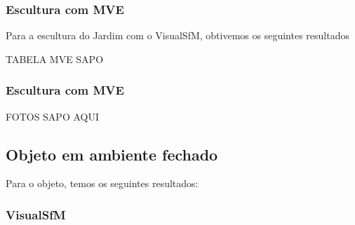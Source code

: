 \documentclass[table, usenames, svgnames, xcolor=dvipsnames]{beamer}
\begin{document}
\begin{frame}
	\begin{center}
	\end{center}
\end{frame}


\begin{frame}
\frametitle{\textbf{Escultura com MVE}}
	Para a escultura do Jardim com o VisualSfM, obtivemos os seguintes resultados
	
	TABELA MVE SAPO
\end{frame}

\begin{frame}
\frametitle{\textbf{Escultura com MVE}}
	FOTOS SAPO AQUI
\end{frame}

\subsection{Objeto em ambiente fechado}

\begin{frame}
	\begin{center}
	\end{center}
\end{frame}

\begin{frame}
	\begin{center}
	\end{center}
\end{frame}



\begin{frame}
	Para o objeto, temos os seguintes resultados:
\end{frame}

\subsubsection{VisualSfM}
\end{document}
